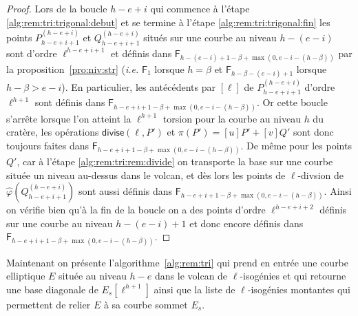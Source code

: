 \documentclass[10pt,a4paper]{book}
\theoremstyle{plain}
\theoremstyle{definition}
\theoremstyle{definition}
\theoremstyle{definition}
\theoremstyle{definition}
\theoremstyle{remark}
\theoremstyle{remark}
\theoremstyle{definition}
\begin{document}
\begin{proof}
Lors de la boucle $h-e+i$ qui commence à l'étape \ref{alg:rem:tri:trigonal:debut} 
et se termine à l'étape \ref{alg:rem:tri:trigonal:fin} les points $P_{h-e+i+1}^{(h-e+i)}$ et 
$Q_{h-e+i+1}^{(h-e+i)}$ situés sur une courbe au niveau $h-(e-i)$ sont d'ordre 
$\ell^{h-e+i+1}$ et définis dans $\mathsf{F}_{h-(e-i)+1-\beta+
\max(0,e-i-(h-\beta))}$ par la proposition~\ref{pro:niv:str} (\emph{i.e.} 
$\mathsf{F}_{1}$ lorsque $h=\beta$ et $\mathsf{F}_{h-\beta-(e-i)+1}$ lorsque 
$h-\beta>e-i$). En particulier, les antécédents par $[\ell]$ de $P_{h-e+i+1}^
{(h-e+i)}$ d'ordre $\ell^{h+1}$ sont définis dans $\mathsf{F}_{h-e+i+1-\beta+
\max(0,e-i-(h-\beta))}$. Or cette boucle s'arrête lorsque l'on atteint la 
$\ell^{h+1}$ torsion pour la courbe au niveau $h$ du cratère, les opérations 
$\mathsf{divise}(\ell, P')$ et $\pi(P')=[u]P'+[v]Q'$ sont donc toujours faites
dans $\mathsf{F}_{h-e+i+1-\beta+\max(0,e-i-(h-\beta))}$. De même pour les 
points $Q'$, car à l'étape \ref{alg:rem:tri:rem:divide} on transporte la base 
sur une courbe située un niveau au-dessus dans le volcan, et dès lors les points
de $\ell$-divsion de $\widehat{\varphi}(Q_{h-e+i+1}^{(h-e+i)})$ sont aussi 
définis dans $\mathsf{F}_{h-e+i+1-\beta+\max(0,e-i-(h-\beta))}$. Ainsi on 
vérifie bien qu'à la fin de la boucle on a des points d'ordre $\ell^{h-e+i+2}$ 
définis sur une courbe au niveau $h-(e-i)+1$ et donc encore définis dans 
$\mathsf{F}_{h-e+i+1-\beta+\max(0,e-i-(h-\beta))}$.
\end{proof}

Maintenant on présente l'algorithme~\ref{alg:rem:tri} qui prend en entrée une 
courbe elliptique $E$ située au niveau $h-e$ dans le volcan de 
$\ell$-isogénies et qui retourne une base diagonale de $E_s[\ell^{h+1}]$ ainsi 
que la liste de $\ell$-isogénies montantes qui permettent de relier $E$ à sa 
courbe sommet $E_s$.
\end{document}
